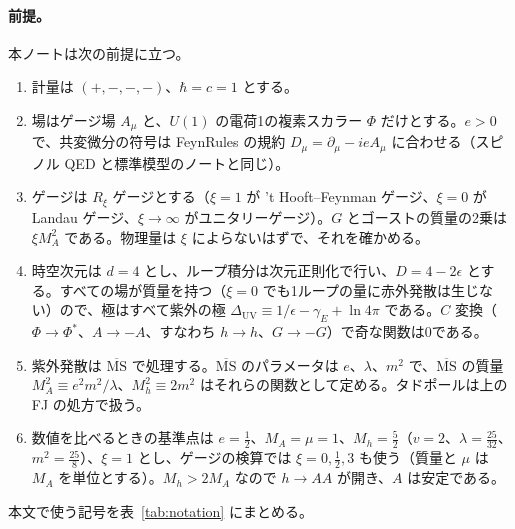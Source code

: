 \documentclass[a4paper,10pt]{ltjsarticle}
\newcommand{\MSbar}{\overline{\mathrm{MS}}}
\newcommand{\DUV}{\Delta_{\mathrm{UV}}}
\begin{document}
\paragraph{前提。}本ノートは次の前提に立つ。
\begin{enumerate}
\item 計量は $(+,-,-,-)$、$\hbar=c=1$ とする。
\item 場はゲージ場 $A_\mu$ と、$U(1)$ の電荷1の複素スカラー $\Phi$ だけとする。$e>0$ で、共変微分の符号は FeynRules の規約 $D_\mu=\partial_\mu-ieA_\mu$ に合わせる（スピノル QED と標準模型のノートと同じ）。
\item ゲージは $R_\xi$ ゲージとする（$\xi=1$ が 't Hooft--Feynman ゲージ、$\xi=0$ が Landau ゲージ、$\xi\to\infty$ がユニタリーゲージ）。$G$ とゴーストの質量の2乗は $\xi M_A^2$ である。物理量は $\xi$ によらないはずで、それを確かめる。
\item 時空次元は $d=4$ とし、ループ積分は次元正則化で行い、$D=4-2\epsilon$ とする。すべての場が質量を持つ（$\xi=0$ でも1ループの量に赤外発散は生じない）ので、極はすべて紫外の極 $\DUV\equiv1/\epsilon-\gamma_E+\ln4\pi$ である。$C$ 変換（$\Phi\to\Phi^*$、$A\to-A$、すなわち $h\to h$、$G\to-G$）で奇な関数は0である。
\item 紫外発散は $\MSbar$ で処理する。$\MSbar$ のパラメータは $e$、$\lambda$、$m^2$ で、$\MSbar$ の質量 $M_A^2\equiv e^2m^2/\lambda$、$M_h^2\equiv2m^2$ はそれらの関数として定める。タドポールは上の FJ の処方で扱う。
\item 数値を比べるときの基準点は $e=\frac12$、$M_A=\mu=1$、$M_h=\frac52$（$v=2$、$\lambda=\frac{25}{32}$、$m^2=\frac{25}8$）、$\xi=1$ とし、ゲージの検算では $\xi=0,\frac12,3$ も使う（質量と $\mu$ は $M_A$ を単位とする）。$M_h>2M_A$ なので $h\to AA$ が開き、$A$ は安定である。
\end{enumerate}
本文で使う記号を表~\ref{tab:notation} にまとめる。
\end{document}
